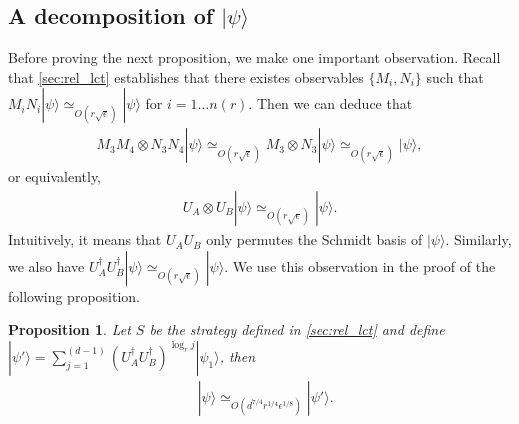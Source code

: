 \documentclass[11pt,letterpaper]{article}
\newcommand{\ket}[1]{|#1\rangle}
\newcommand{\x}{\otimes}
\newcommand{\ct}{^{\dagger}}
\newcommand{\1}{\mathbb{1}}
\newcommand{\nr}{n(r)}
\newcommand{\ep}{\epsilon}
\newcommand{\se}{\sqrt{\epsilon}}
\newcommand{\appd}[1]{\simeq_{#1}}
\newtheorem{proposition}[theorem]{Proposition}
\theoremstyle{definition}
\begin{document}
\subsection{A decomposition of $\ket{\psi}$}
Before proving the next proposition, we make one important observation.
Recall that \cref{sec:rel_lct} establishes that there existes observables $\{M_i, N_i\}$ such that 
$M_iN_i \ket{\psi} \appd{O(r\se)} \ket{\psi}$ for $i = 1 \dots \nr$.
Then we can deduce that 
\begin{align}
	M_3M_4 \x N_3N_4 \ket{\psi} \appd{O(r\se)} M_3 \x N_3 \ket{\psi} \appd{O(r\se)} \ket{\psi},
\end{align}
or equivalently,
\begin{align}
	U_A \x U_B \ket{\psi} \appd{O(r\se)} \ket{\psi}.
\end{align}
Intuitively, it means that $U_A U_B $ only permutes the Schmidt basis of $\ket{\psi}$.
Similarly, we also have $U_A\ct U_B\ct \ket{\psi} \appd{O(r\se)} \ket{\psi}$.
We use this observation in the proof of the following proposition.
\begin{proposition}
\label{prop:decomp_psi}
Let $S$ be the strategy defined in \cref{sec:rel_lct} and 
define 
$\ket{\psi'} = \sum_{j=1}^{(d-1)} (U_A\ct U_B\ct)^{\log_r j} \ket{\psi_1}$,
then
\begin{align}
	&\ket{\psi} \appd{O(d^{7/4} r^{1/4} \ep^{1/8})} \ket{\psi'}.
\end{align}
\end{proposition}
\end{document}

